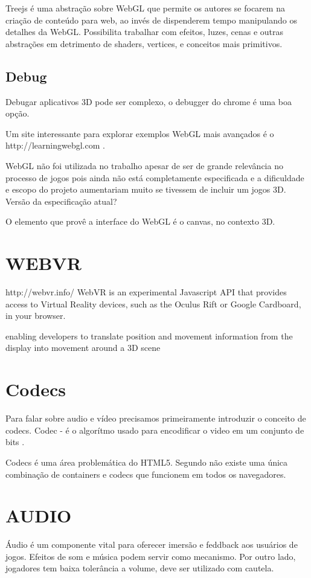 Treejs é uma abstração sobre WebGL que permite os autores se focarem
na criação de conteúdo para web, ao invés de dispenderem tempo manipulando
os detalhes da WebGL. Possibilita trabalhar com efeitos, luzes, cenas
e outras abstrações em detrimento de shaders, vertices, e conceitos mais
primitivos.

\subsection{Debug}

Debugar aplicativos 3D pode ser complexo, o debugger do chrome é uma boa opção.


Um site interessante para explorar exemplos WebGL mais avançados é o
http://learningwebgl.com \autocite[pp.42]{3daps}.

WebGL não foi utilizada no trabalho apesar de ser de grande relevância
no processo de jogos pois ainda não está completamente especificada
e a dificuldade e escopo do projeto aumentariam muito se tivessem de
incluir um jogos 3D. Versão da especificação atual?

O elemento que provê a interface do WebGL é o canvas, no contexto 3D.

\section{WEBVR}

http://webvr.info/
WebVR is an experimental Javascript API that provides access to Virtual Reality devices, such as the Oculus Rift or Google Cardboard, in your browser.

enabling developers to translate position and movement information from the display into movement around a 3D scene


\section{Codecs}
Para falar sobre audio e vídeo precisamos primeiramente introduzir o conceito de codecs. Codec - é o algorítmo usado para encodificar o video em um conjunto de bits \cite{diveIntohtml}.

Codecs é uma área problemática do HTML5. Segundo \cite{diveIntohtml} não existe uma única combinação de containers e codecs que funcionem em todos os navegadores.


\section{AUDIO}
Áudio é um componente vital para oferecer imersão e feddback aos
usuários de jogos. Efeitos de som e música podem servir como mecanismo. 
Por outro lado, jogadores tem baixa tolerância a volume, deve ser utilizado com cautela.

